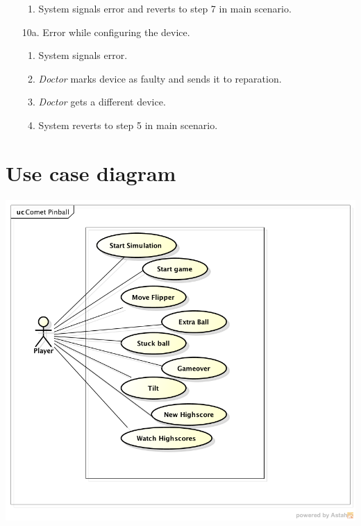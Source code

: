 \documentclass[fontsize=12pt,
               paper=a4,
               twoside=false,
               parskip=half,
               ]{scrartcl}
\begin{document}
\begin{itemize}[leftmargin=3em]
\begin{enumerate}
		\item System signals error and reverts to step 7 in main scenario.
	\end{enumerate}
	\item[10a.] Error while configuring the device.
	\begin{enumerate}
		\item System signals error.
		\item \emph{Doctor} marks device as faulty and sends it to reparation.
		\item \emph{Doctor} gets a different device.
		\item System reverts to step 5 in main scenario.
	\end{enumerate}
\end{itemize}

\section{Use case diagram}


\includegraphics[width=15cm]{./img/usecase-model.png}
\end{document}
